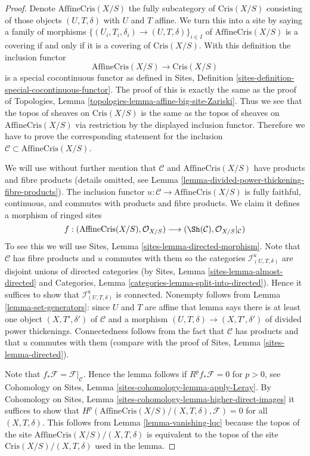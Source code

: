 \begin{proof}
Denote $\text{AffineCris}(X/S)$ the fully subcategory of $\text{Cris}(X/S)$
consisting of those objects $(U, T, \delta)$ with $U$ and $T$ affine.
We turn this into a site by saying a family of morphisms
$\{(U_i, T_i, \delta_i) \to (U, T, \delta)\}_{i \in I}$ of
$\text{AffineCris}(X/S)$ is a covering if and only if it is a covering
of $\text{Cris}(X/S)$. With this definition the inclusion functor
$$
\text{AffineCris}(X/S) \longrightarrow \text{Cris}(X/S)
$$
is a special cocontinuous functor as defined in
Sites, Definition \ref{sites-definition-special-cocontinuous-functor}.
The proof of this is exactly the same as the proof of
Topologies, Lemma \ref{topologies-lemma-affine-big-site-Zariski}.
Thus we see that the topos of sheaves on $\text{Cris}(X/S)$
is the same as the topos of sheaves on $\text{AffineCris}(X/S)$
via restriction by the displayed inclusion functor.
Therefore we have to prove the corresponding statement for the
inclusion $\mathcal{C} \subset \text{AffineCris}(X/S)$.

\medskip\noindent
We will use without further mention that $\mathcal{C}$ and
$\text{AffineCris}(X/S)$ have products and fibre products
(details omitted, see
Lemma \ref{lemma-divided-power-thickening-fibre-products}).
The inclusion functor $u : \mathcal{C} \to \text{AffineCris}(X/S)$
is fully faithful, continuous, and commutes with products and fibre products.
We claim it defines a morphism of ringed sites
$$
f :
(\text{AffineCris}(X/S), \mathcal{O}_{X/S})
\longrightarrow
(\Sh(\mathcal{C}), \mathcal{O}_{X/S}|_\mathcal{C})
$$
To see this we will use Sites, Lemma \ref{sites-lemma-directed-morphism}.
Note that $\mathcal{C}$ has fibre products and $u$ commutes with them
so the categories $\mathcal{I}^u_{(U, T, \delta)}$ are disjoint unions
of directed categories (by Sites, Lemma \ref{sites-lemma-almost-directed} and
Categories, Lemma \ref{categories-lemma-split-into-directed}). Hence it
suffices to show that $\mathcal{I}^u_{(U, T, \delta)}$ is connected.
Nonempty follows from Lemma \ref{lemma-set-generators}: since $U$ and $T$
are affine that lemma says there is at least one object
$(X, T', \delta')$ of $\mathcal{C}$ and a morphism
$(U, T, \delta) \to (X, T', \delta')$ of divided power thickenings.
Connectedness follows from the fact that $\mathcal{C}$ has products
and that $u$ commutes with them (compare with the proof of
Sites, Lemma \ref{sites-lemma-directed}).

\medskip\noindent
Note that $f_*\mathcal{F} = \mathcal{F}|_\mathcal{C}$. Hence the lemma
follows if $R^pf_*\mathcal{F} = 0$ for $p > 0$, see
Cohomology on Sites, Lemma \ref{sites-cohomology-lemma-apply-Leray}. By
Cohomology on Sites, Lemma \ref{sites-cohomology-lemma-higher-direct-images}
it suffices to show that
$H^p(\text{AffineCris}(X/S)/(X, T, \delta), \mathcal{F}) = 0$
for all $(X, T, \delta)$.
This follows from Lemma \ref{lemma-vanishing-lqc} because the
topos of the site $\text{AffineCris}(X/S)/(X, T, \delta)$
is equivalent to the topos of the site
$\text{Cris}(X/S)/(X, T, \delta)$ used in the lemma.
\end{proof}

